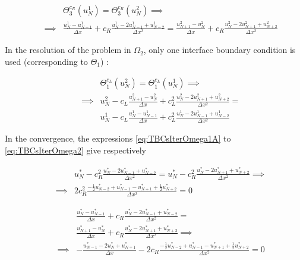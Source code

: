 \begin{equation}
	\begin{aligned}
    \label{eq:TBCsIterOmega1B}
    && 			   & \Theta_3^{c_R}(u_N^1) = \Theta_3^{c_R}(u_N^2) \implies \\
    && \implies & \frac{u_N^1 - u_{N-1}^1}{\Delta x} + c_R \frac{u_N^1 - 2u_{N-1}^1 + u_{N-2}^1}{\Delta x^2} = \frac{u_{N+1}^2 - u_{N}^2}{\Delta x} + c_R \frac{u_N^2 - 2u_{N+1}^2 + u_{N+2}^2}{\Delta x^2}
    \end{aligned}
\end{equation}

\indent In the resolution of the problem in $\Omega_2$, only one interface boundary condition is used (corresponding to $\Theta_1$) :

\begin{equation}
	\begin{aligned}
    \label{eq:TBCsIterOmega2}
    && 				&\Theta_1^{c_L}(u_N^2) = \Theta_1^{c_L}(u_N^1) \implies \\ 
    && \implies & u_N^2 - c_L \frac{u_{N+1}^2 - u_{N}^2}{\Delta x} + c_L^2 \frac{u_N^2 - 2u_{N+1}^2 + u_{N+2}^2}{\Delta x^2}  =\\
    && 				& u_N^1 - c_L \frac{u_{N}^1 - u_{N-1}^1}{\Delta x} + c_L^2 \frac{u_N^1 - 2u_{N-1}^1 + u_{N-2}^1}{\Delta x^2}
    \end{aligned}
\end{equation}

\indent In the convergence, the expressions \eqref{eq:TBCsIterOmega1A} to \eqref{eq:TBCsIterOmega2} give respectively

\begin{equation*}
    \label{eq:TBCsCVOmega1A}
\begin{aligned}
    && 			    &u_N^* - c_R^2 \frac{u_N^* - 2u_{N-1}^* + u_{N-2}^*}{\Delta x^2} = u_N^* - c_R^2 \frac{u_N^* - 2u_{N+1}^* + u_{N+2}^*}{\Delta x^2} \implies  \\
    && \implies & 2c_R^2 \frac{-\frac{1}{2}u_{N-2}^* + u_{N-1}^* - u_{N+1}^* + \frac{1}{2}u_{N+2}^* }{\Delta x^2} = 0
    \end{aligned}
    \end{equation*}
    
\begin{equation*}
    \label{eq:TBCsCVOmega1B}
\begin{aligned}
    &&             &\frac{u_N^* - u_{N-1}^*}{\Delta x} + c_R \frac{u_N^* - 2u_{N-1}^* + u_{N-2}^*}{\Delta x^2} = \\
    && 			   &\frac{u_{N+1}^* - u_{N}^*}{\Delta x} + c_R \frac{u_N^* - 2u_{N+1}^* + u_{N+2}^*}{\Delta x^2} \implies \\
    && \implies & -\frac{u_{N-1}^* - 2 u_{N}^* + u_{N+1}^*}{\Delta x} - 2c_R\frac{-\frac{1}{2}u_{N-2}^* + u_{N-1}^* - u_{N+1}^* + \frac{1}{2}u_{N+2}^* }{\Delta x^2} = 0 
\end{aligned}
\end{equation*}

